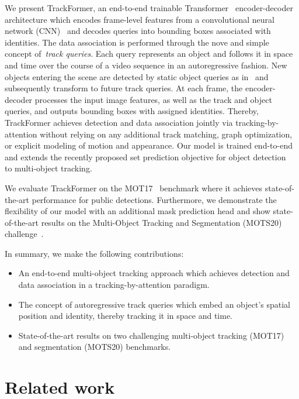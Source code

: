 \documentclass[10pt,twocolumn,letterpaper]{article}
\begin{document}
We present \mbox{TrackFormer}, an end-to-end trainable Transformer~\cite{attention_is_all_you_need} encoder-decoder architecture which encodes frame-level features from a convolutional neural network (CNN)~\cite{he2016deep} and decodes queries into bounding boxes associated with identities.
The data association is performed through the nove and simple concept of~\textit{track queries}.
Each query represents an object and follows it in space and time over the course of a video sequence in an autoregressive fashion.
New objects entering the scene are detected by static object queries as in~\cite{DETR,deformable_detr} and subsequently transform to future track queries.
At each frame, the encoder-decoder processes the input image features, as well as the track and object queries, and outputs bounding boxes with assigned identities.
Thereby, TrackFormer achieves detection and data association jointly via tracking-by-attention without relying on any additional track matching, graph optimization, or explicit modeling of motion and appearance.
Our model is trained end-to-end and extends the recently proposed set prediction objective for object detection~\cite{stewart2016end,DETR,deformable_detr} to multi-object tracking.

We evaluate TrackFormer on the MOT17~\cite{MOT16} benchmark where it achieves state-of-the-art performance for public detections.
Furthermore, we demonstrate the flexibility of our model with an additional mask prediction head and show state-of-the-art results on the Multi-Object Tracking and Segmentation (MOTS20) challenge~\cite{MOTS}.

In summary, we make the following {contributions}:

\begin{itemize}
	\item An end-to-end multi-object tracking approach which achieves detection and data association in a  tracking-by-attention paradigm.

	\item The  concept of autoregressive track queries which embed an object's spatial position and identity, thereby tracking it in space and time.



	\item State-of-the-art results on two challenging multi-object tracking (MOT17) and segmentation (MOTS20) benchmarks.
\end{itemize}
 \section{Related work}
\end{document}
